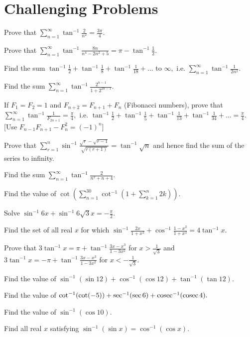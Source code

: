\section{Challenging Problems}
\startitemize[n, 1*broad]
\item Prove that $\sum_{n = 1}^{\infty}\tan^{-1}\frac{2}{n^2} = \frac{3\pi}{4}.$
\item Prove that $\sum_{n = 1}^{\infty}\tan^{-1}\frac{8n}{n^4 - 2n^2 + 5} = \pi - \tan^{-1}\frac{1}{2}.$
\item Find the sum $\tan^{-1}\frac{1}{2} + \tan^{-1}\frac{1}{8} + \tan^{-1}\frac{1}{18} + \ldots$ to $\infty,$ i.e.
  $\sum_{n = 1}^{\infty}\tan^{-1}\frac{1}{2n^2}.$
\item Find the sum $\sum_{n = 1}^{\infty}\tan^{-1}\frac{2^{n - 1}}{1 + 2^{2n - 1}}.$
\item If $F_1 = F_2 = 1$ and $F_{n + 2} = F_{n + 1} + F_n$ (Fibonacci numbers), prove that $\sum_{n =
  1}^{\infty}\tan^{-1}\frac{1}{F_{2n + 1}} = \frac{\pi}{4},$ i.e. $\tan^{-1}\frac{1}{2} + \tan^{-1}\frac{1}{5} +
  \tan^{-1}\frac{1}{13} + \tan^{-1}\frac{1}{34} + \ldots = \frac{\pi}{4}.$ [Use $F_{n - 1}F_{n + 1} - F_n^2 = (-1)^n$]
\item Prove that $\sum_{r = 1}^{n}\sin^{-1}\frac{\sqrt{r} - \sqrt{r - 1}}{\sqrt{r(r + 1)}} = \tan^{-1}\sqrt{n}$ and
  hence find the sum of the series to infinity.
\item Find the sum $\sum_{n = 1}^{\infty}\tan^{-1}\frac{2}{n^2 + n + 4}.$
\item Find the value of $\cot\left(\sum_{n = 1}^{30}\cot^{-1}\left(1 + \sum_{k = 1}^{n}2k\right)\right).$
\item Solve $\sin^{-1}6x + \sin^{-1}6\sqrt{3}x = -\frac{\pi}{2}.$
\item Find the set of all real $x$ for which $\sin^{-1}\frac{2x}{1 + x^2} + \cos^{-1}\frac{1 - x^2}{1 + x^2} =
  4\tan^{-1}x.$
\item Prove that $3\tan^{-1}x = \pi + \tan^{-1}\frac{3x - x^3}{1 - 3x^2}$ for $x > \frac{1}{\sqrt{3}}$ and $3\tan^{-1}x =
  -\pi + \tan^{-1}\frac{3x - x^3}{1 - 3x^2}$ for $x < -\frac{1}{\sqrt{3}}.$
\item Find the value of $\sin^{-1}(\sin 12) + \cos^{-1}(\cos 12) + \tan^{-1}(\tan 12).$
\item Find the value of $\cot^{-1}(\cot(-5)) + \sec^{-1}(\sec 6) + {\rm cosec}^{-1}({\rm cosec}\,4).$
\item Find the value of $\sin^{-1}(\cos 10).$
\item Find all real $x$ satisfying $\sin^{-1}(\sin x) = \cos^{-1}(\cos x).$
